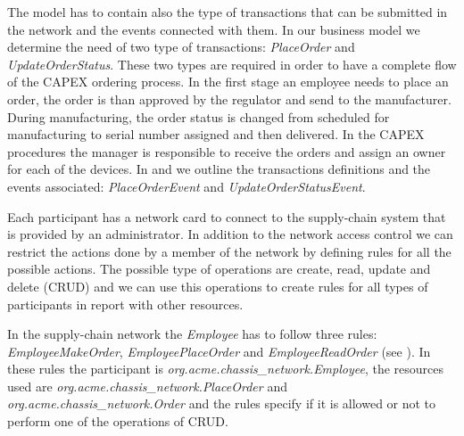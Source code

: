 The model has to contain also the type of transactions that can be submitted in the network and the events connected with them. In our business model we determine the need of two type of transactions: \emph{PlaceOrder} and \emph{UpdateOrderStatus}.
These two types are required in order to have a complete flow of the CAPEX ordering process. In the first stage an employee needs to place an order, the order is than approved by the regulator and send to the manufacturer. During manufacturing, the order status is changed from scheduled for manufacturing to serial number assigned and then delivered. In the CAPEX procedures the manager is responsible to receive the orders and assign an owner for each of the devices. In  and  we outline the transactions definitions and the events associated: \emph{PlaceOrderEvent} and \emph{UpdateOrderStatusEvent}.



Each participant has a network card to connect to the supply-chain system that is provided by an administrator. In addition to the network access control we can restrict the actions done by a member of the network by defining rules for all the possible actions. The possible type of operations are create, read, update and delete (CRUD) and we can use this operations to create rules for all types of participants in report with other resources. 

In the supply-chain network the \emph{Employee} has to follow three rules: \emph{EmployeeMakeOrder}, \emph{EmployeePlaceOrder} and \emph{EmployeeReadOrder}
(see ). In these rules the participant is \emph{org.acme.chassis_network.Employee}, the resources used are \emph{org.acme.chassis_network.PlaceOrder} and \emph{org.acme.chassis_network.Order} and the rules specify if it is allowed or not to perform one of the operations of CRUD. 


